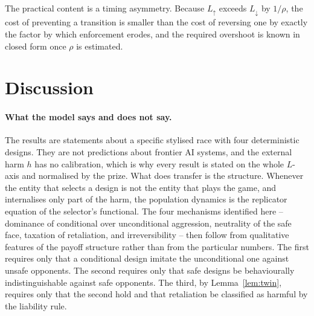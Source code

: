 \documentclass[pdflatex]{sn-jnl}
\theoremstyle{thmstyleone}
\theoremstyle{thmstylethree}
\theoremstyle{thmstyletwo}
\begin{document}
The practical content is a timing asymmetry. Because $L_{\uparrow}$ exceeds
$L_{\downarrow}$ by $1/\rho$, the cost of preventing a transition is smaller
than the cost of reversing one by exactly the factor by which enforcement
erodes, and the required overshoot is known in closed form once $\rho$ is
estimated.

\section{Discussion}\label{sec:discussion}

\paragraph{What the model says and does not say.}
The results are statements about a specific stylised race with four
deterministic designs. They are not predictions about frontier AI systems, and
the external harm $h$ has no calibration, which is why every result is stated
on the whole $L$-axis and normalised by the prize. What does transfer is the
structure. Whenever the entity that selects a design is not the entity that
plays the game, and internalises only part of the harm, the population
dynamics is the replicator equation of the selector's functional. The four
mechanisms identified here -- dominance of conditional over unconditional
aggression, neutrality of the safe face, taxation of retaliation, and
irreversibility -- then follow from qualitative features of the payoff
structure rather than from the particular numbers. The first requires only
that a conditional design imitate the unconditional one against unsafe
opponents. The second requires only that safe designs be behaviourally
indistinguishable against safe opponents. The third, by Lemma~\ref{lem:twin},
requires only that the second hold and that retaliation be classified as
harmful by the liability rule.
\end{document}

